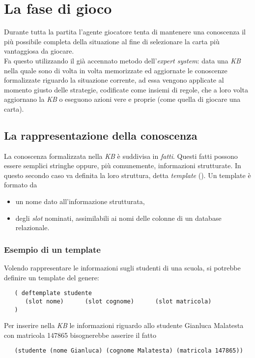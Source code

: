 \section{La fase di gioco}



Durante tutta la partita l'agente giocatore tenta di mantenere una conoscenza il più possibile completa della situazione al fine di selezionare la carta più vantaggiosa da giocare.\\
Fa questo utilizzando il già accennato metodo dell'\emph{expert system}: data una \emph{KB} nella quale sono di volta in volta memorizzate ed aggiornate le conoscenze formalizzate riguardo la situazione corrente, ad essa vengono applicate al momento giusto delle strategie, codificate come insiemi di regole, che a loro volta aggiornano la \emph{KB} o eseguono azioni vere e proprie (come quella di giocare una carta).



\subsection{La rappresentazione della conoscenza}

La conoscenza formalizzata nella \emph{KB} è suddivisa in \emph{fatti}.
Questi fatti possono essere semplici stringhe oppure, più comunemente, informazioni strutturate.
In questo secondo caso va definita la loro struttura, detta \emph{template} (\cite{jessbook}).
Un template è formato da
\begin{itemize}
   \item un nome dato all'informazione strutturata,
   \item degli \emph{slot} nominati, assimilabili ai nomi delle colonne di un database relazionale.
\end{itemize}


\subsubsection*{Esempio di un template}
Volendo rappresentare le informazioni sugli studenti di una scuola, si potrebbe definire un template del genere:
\begin{verbatim}
   ( deftemplate studente 
      (slot nome)      (slot cognome)      (slot matricola)
   )
\end{verbatim}
Per inserire nella \emph{KB} le informazioni riguardo allo studente Gianluca Malatesta con matricola 147865 bisognerebbe asserire il fatto
\begin{verbatim}
   (studente (nome Gianluca) (cognome Malatesta) (matricola 147865))
\end{verbatim}


